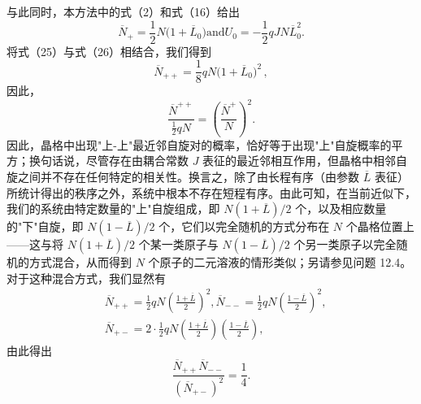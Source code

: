 与此同时，本方法中的式（2）和式（16）给出
\begin{equation}\tag{12.5.25}\label{eq:12.5.25}
\overline { { N } } _ { + } = \frac { 1 } { 2 } N \big ( 1 + \overline { { L } } _ { 0 } \big )  \mathrm { a n d }  U _ { 0 } = - \frac { 1 } { 2 } q J N \overline { { L } } _ { 0 } ^{2} .
\end{equation}
将式（25）与式（26）相结合，我们得到
\begin{equation}\tag{12.5.26}\label{eq:12.5.26}
\overline { { N } } _ { + + } = \frac { 1 } { 8 } q N \big ( 1 + \overline { { L } } _ { 0 } \big ) ^{2} \, ,
\end{equation}
因此，
\begin{equation}\tag{12.5.27}\label{eq:12.5.27}
{ \frac { \overline { { N } } ^{+ +} } { \frac { 1 } { 2 } q N } } = \left( { \frac { \overline { { N } } ^{+} } { N } } \right) ^{2} .
\end{equation}
因此，晶格中出现"上-上"最近邻自旋对的概率，恰好等于出现"上"自旋概率的平方；换句话说，尽管存在由耦合常数 \(J\) 表征的最近邻相互作用，但晶格中相邻自旋之间并不存在任何特定的相关性。换言之，除了由长程有序（由参数 \(\overline{L}\) 表征）所统计得出的秩序之外，系统中根本不存在短程有序。由此可知，在当前近似下，我们的系统由特定数量的"上"自旋组成，即 \(N(1+\overline{L})/2\) 个，以及相应数量的"下"自旋，即 \(N(1-\overline{L})/2\) 个，它们以完全随机的方式分布在 \(N\) 个晶格位置上——这与将 \(N(1+\overline{L})/2\) 个某一类原子与 \(N(1-\overline{L})/2\) 个另一类原子以完全随机的方式混合，从而得到 \(N\) 个原子的二元溶液的情形类似；另请参见问题 12.4。对于这种混合方式，我们显然有
\begin{equation}\tag{12.5.28}\label{eq:12.5.28}
\begin{array}{rl} & { \overline { { N } } _ { + + } = \frac { 1 } { 2 } q N \left( \frac { 1 + \overline { { L } } } { 2 } \right) ^{2} ,  \overline { { N } } _ { -- } = \frac { 1 } { 2 } q N \left( \frac { 1 - \overline { { L } } } { 2 } \right) ^{2} , } \\& { \overline { { N } } _ { + - } = 2 \cdot \frac { 1 } { 2 } q N \left( \frac { 1 + \overline { { L } } } { 2 } \right) \left( \frac { 1 - \overline { { L } } } { 2 } \right) , } \end{array}
\end{equation}
由此得出
\begin{equation}\tag{12.5.29}\label{eq:12.5.29}
\frac { \overline { { N } } _ { + + } \overline { { N } } _ { -- } } { ( \overline { { N } } _ { + - } ) ^{2} } = \frac { 1 } { 4 } .
\end{equation}
